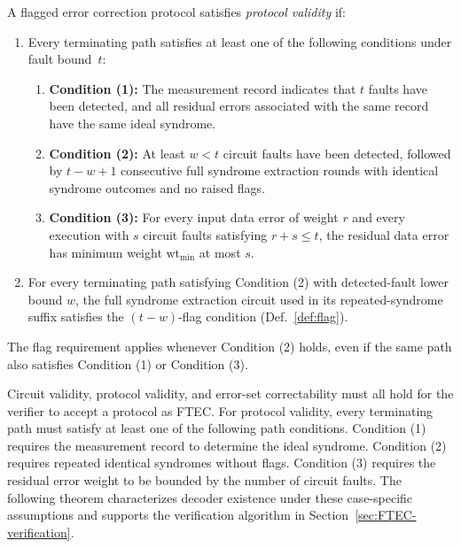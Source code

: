 \documentclass[acmsmall,screen,review,anonymous,nonacm]{acmart}
\begin{document}
\begin{definition}
\label{def:protocol-validity}
A flagged error correction protocol satisfies \emph{protocol validity} if:
\begin{enumerate}[leftmargin=*]
    \item Every terminating path satisfies at least one of the following
    conditions under fault bound~$t$:
    \begin{enumerate}
        \item \textbf{Condition (1):} The measurement record indicates
        that $t$ faults have been detected, and all residual errors
        associated with the same record have the same ideal syndrome.
        \item \textbf{Condition (2):} At least $w<t$ circuit faults
        have been detected, followed by $t-w+1$ consecutive full
        syndrome extraction rounds with identical syndrome outcomes
        and no raised flags.
        \item \textbf{Condition (3):} For every input data error of
        weight $r$ and every execution with $s$ circuit faults
        satisfying $r+s\le t$, the residual data error has
        minimum weight $\mathrm{wt}_{\min}$ at most $s$.
    \end{enumerate}
    \item For every terminating path satisfying Condition (2) with
    detected-fault lower bound $w$, the full syndrome extraction
    circuit used in its repeated-syndrome suffix satisfies the
    $(t-w)$-flag condition (Def.~\ref{def:flag}).
\end{enumerate}
The flag requirement applies whenever Condition (2) holds, even
if the same path also satisfies Condition (1) or Condition (3).
\end{definition}



Circuit validity, protocol validity, and error-set correctability
must all hold for the verifier to accept a protocol as FTEC.
For protocol validity, every terminating path must satisfy at least
one of the following path conditions.
Condition (1) requires the measurement record to determine the
ideal syndrome. Condition (2) requires repeated identical syndromes
without flags. Condition (3) requires the residual error weight
to be bounded by the number of circuit faults.
The following theorem characterizes decoder existence under these
case-specific assumptions and supports the verification algorithm
in Section~\ref{sec:FTEC-verification}.
\end{document}
